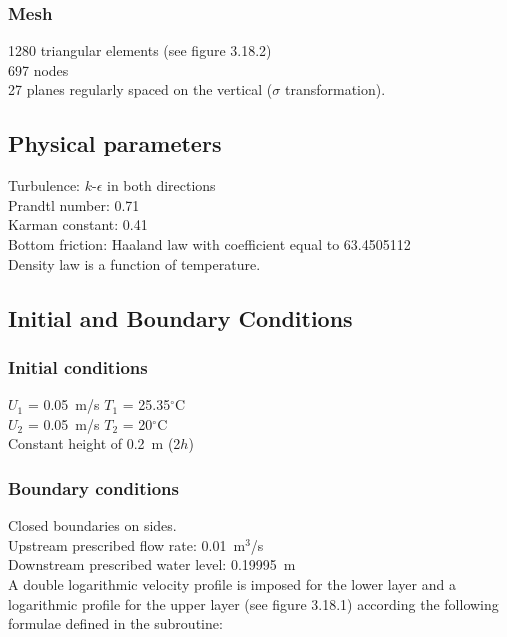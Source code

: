 \subsubsection{Mesh}
%
1280 triangular elements (see figure 3.18.2)\\
697 nodes\\
27 planes regularly spaced on the vertical ($\sigma$ transformation).
%
%
%
\subsection{Physical parameters}
%
Turbulence: $k$-$\epsilon$ in both directions\\
      Prandtl number: 0.71\\
      Karman constant: 0.41\\
Bottom friction: Haaland law with coefficient equal to 63.4505112\\
Density law is a function of temperature.
%
%
%
%
%
%
\subsection{Initial and Boundary Conditions}
%
\subsubsection{Initial conditions}
%
$U_1$ = 0.05~m/s $T_1$ = 25.35$^\circ$C\\
$U_2$ = 0.05~m/s $T_2$ = 20$^\circ$C\\
Constant height of 0.2~m (2$h$)
%
\subsubsection{Boundary conditions}
%
Closed boundaries on sides.\\
Upstream prescribed flow rate: 0.01~m$^3$/s\\
Downstream prescribed water level: 0.19995~m\\
A double logarithmic velocity profile is imposed for the lower layer and
a logarithmic profile for the upper layer (see figure 3.18.1) according
the following formulae defined in the  subroutine:\\

